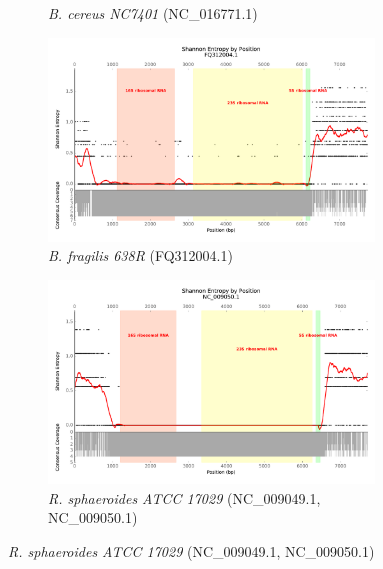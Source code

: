 \documentclass[10pt]{article}
\begin{document}
\begin{figure}[H]
\begin{subfigure}[b]{.45\textwidth}
    \caption{\textit{B. cereus NC7401} (NC\_016771.1)}
    \label{fig:ent_cereus_nc}
  \end{subfigure}
  \begin{subfigure}[b]{.45\textwidth}
    \includegraphics[width=0.95\textwidth]{gage_entropy_figures/FQ312004.1_entropy_plot}
    \caption{\textit{B. fragilis 638R} (FQ312004.1)}
    \label{fig:ent_frag}
  \end{subfigure}
  \begin{subfigure}[b]{.45\textwidth}
    \includegraphics[width=0.95\textwidth]{gage_entropy_figures/NC_009050.1_entropy_plot}
    \caption{\textit{R. sphaeroides  ATCC 17029} (NC\_009049.1, NC\_009050.1)}
    \label{fig:ent_rhodo}
  \end{subfigure}
\end{figure}
\end{document}
